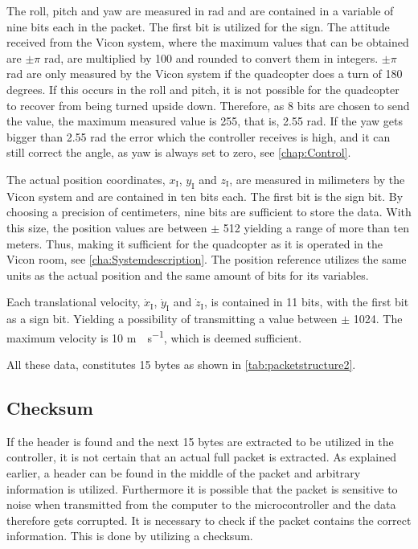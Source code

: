 The roll, pitch and yaw are measured in rad and are contained in a variable of nine bits each in the packet. The first bit is utilized for the sign. The attitude received from the Vicon system, where the maximum values that can be obtained are $\pm\pi$ rad, are multiplied by 100 and rounded to convert them in integers. $\pm\pi$ rad are only measured by the Vicon system if the quadcopter does a turn of 180 degrees. If this occurs in the roll and pitch, it is not possible for the quadcopter to recover from being turned upside down. Therefore, as 8 bits are chosen to send the value, the maximum measured value is 255, that is, 2.55 rad. If the yaw gets bigger than 2.55 rad the error which the controller receives is high, and it can still correct the angle, as yaw is always set to zero, see \autoref{chap:Control}.

The actual position coordinates, $x_{\mathrm{I}}$, $y_{\mathrm{I}}$ and $z_{\mathrm{I}}$, are measured in milimeters by the Vicon system and are contained in ten bits each. The first bit is the sign bit. By choosing a precision of centimeters, nine bits are sufficient to store the data. With this size, the position values are between $\pm$ 512 yielding a range of more than ten meters. Thus, making it sufficient for the quadcopter as it is operated in the Vicon room, see \autoref{cha:Systemdescription}. The position reference utilizes the same units as the actual position and the same amount of bits for its variables.

Each translational velocity, $\dot{x}_{\mathrm{I}}$, $\dot{y}_{\mathrm{I}}$ and $\dot{z}_{\mathrm{I}}$, is contained in 11 bits, with the first bit as a sign bit. Yielding a possibility of transmitting a value between $\pm$ 1024. The maximum velocity is 10 \si{m \cdot s^{-1}}, which is deemed sufficient.

All these data, constitutes 15 bytes as shown in \autoref{tab:packetstructure2}.


\subsection{Checksum}
If the header is found and the next 15 bytes are extracted to be utilized in the controller, it is not certain that an actual full packet is extracted. As explained earlier, a header can be found in the middle of the packet and arbitrary information is utilized. Furthermore it is possible that the packet is sensitive to noise when transmitted from the computer to the microcontroller and the data therefore gets corrupted. It is necessary to check if the packet contains the correct information. This is done by utilizing a checksum. 

